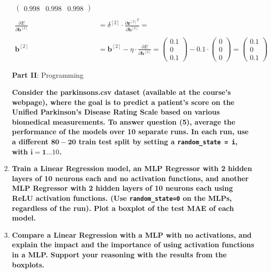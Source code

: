 \documentclass[12pt]{article}
\begin{document}
\begin{enumerate}
\begin{equation*}
\begin{aligned}
\begin{pmatrix}
            0.998 & 0.998 & 0.998
        \end{pmatrix}\\
        \\
        \frac{\partial E}{\partial \mathbf{b}^{[2]}}&= \delta^{[2]} \cdot \frac{{\partial \mathbf{z}^{[2]}}^T}{\partial \mathbf{b}^{[2]}} = \\
        \\
        \mathbf{b}^{[2]} &= \mathbf{b}^{[2]} - \eta \cdot \frac{\partial E}{\partial \mathbf{b}^{[2]}} = \begin{pmatrix}
            0.1\\
            0\\
            0.1
        \end{pmatrix} - 0.1 \cdot \begin{pmatrix}
            0\\
            0\\
            0
        \end{pmatrix} = \begin{pmatrix}
            0.1\\
            0\\
            0.1
        \end{pmatrix}
    \end{aligned}
\end{equation*}

\vspace{20pt}
\large{\textbf{Part II}: Programming}\normalsize

\vspace{10pt}
\textbf{Consider the parkinsons.csv dataset (available at the course's webpage), where the goal is
to predict a patient's score on the Unified Parkinson's Disease Rating Scale based on various
biomedical measurements.
To answer question (5), average the performance of the models over 10 separate runs. In each
run, use a different $\mathbf{80-20}$ train test split by setting a \texttt{random\_state = i}, with $\mathbf{i=1...10}$.}


\item \textbf{Train a Linear Regression model, an MLP Regressor with 2 hidden layers of 10
neurons each and no activation functions, and another MLP Regressor with 2 hidden
layers of 10 neurons each using ReLU activation functions. (Use \texttt{random\_state=0} on the
MLPs, regardless of the run). Plot a boxplot of the test MAE of each model.}

\item \textbf{Compare a Linear Regression with a MLP with no activations, and explain the impact
and the importance of using activation functions in a MLP. Support your reasoning with the
results from the boxplots.}


\end{enumerate}
\end{document}
